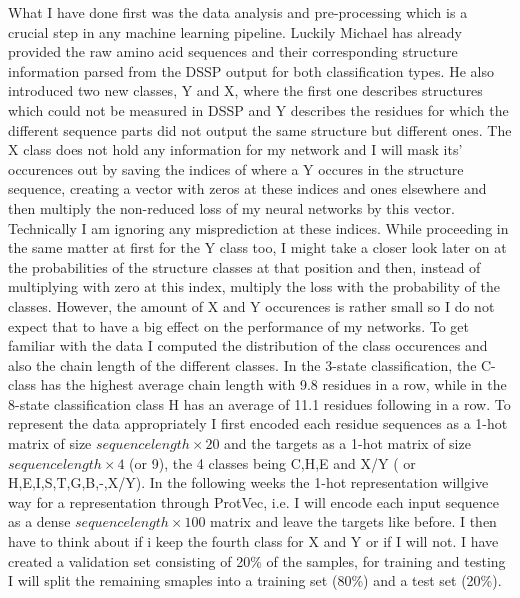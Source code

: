 \documentclass{article}
\begin{document}
What I have done first was the data analysis and pre-processing which is a crucial step in any machine learning pipeline. Luckily Michael has already provided the raw amino acid sequences and their corresponding structure information parsed from the DSSP output for both classification types. He also introduced two new classes, Y and X, where the first one describes structures which could not be measured in DSSP and Y describes the residues for which the different sequence parts did not output the same structure but different ones. The X class does not hold any information for my network and I will mask its' occurences out by saving the indices of where a Y occures in the structure sequence, creating a vector with zeros at these indices and ones elsewhere and then multiply the non-reduced loss of my neural networks by this vector. Technically I am ignoring any misprediction at these indices. While proceeding in the same matter at first for the Y class too, I might take a closer look later on at the probabilities of the structure classes at that position and then, instead of multiplying with zero at this index, multiply the loss with the probability of the classes. However, the amount of X and Y occurences is rather small so I do not expect that to have a big effect on the performance of my networks.
To get familiar with the data I computed the distribution of the class occurences and also the chain length of the different classes. In the 3-state classification, the C-class has the highest average chain length with 9.8 residues in a row, while in the 8-state classification class H has an average of 11.1 residues following in a row.
To represent the data appropriately I first encoded each residue sequences as a 1-hot matrix of size $sequence length \times 20$ and the targets as a 1-hot matrix of size $sequence length \times 4$ (or 9), the 4 classes being C,H,E and X/Y ( or H,E,I,S,T,G,B,-,X/Y). In the following weeks the 1-hot representation willgive way for a representation through ProtVec, i.e. I will encode each input sequence as a dense $sequence length \times 100$ matrix and leave the targets like before. I then have to think about if i keep the fourth class for X and Y or if I will not.
I have created a validation set consisting of 20\% of the samples, for training and testing I will split the remaining smaples into a training set (80\%) and a test set (20\%).\\
\end{document}

